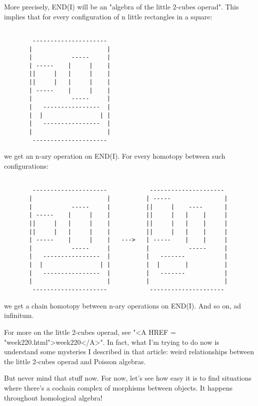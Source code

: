 More precisely, END(I) will be an "algebra of the little 2-cubes 
operad".  This implies that for every configuration of n little 
rectangles in a square:


\begin{verbatim}

        ---------------------
       |                     |
       |           -----     |
       | -----    |     |    | 
       ||     |   |     |    |
       ||     |   |     |    |           
       | -----    |     |    |            
       |           -----     |     
       |   ----------------  |
       |  |                | |
       |   ----------------  |
       |                     |
        ---------------------
\end{verbatim}
    

we get an n-ary operation on END(I).  For every homotopy between
such configurations:


\begin{verbatim}

        ---------------------            ---------------------
       |                     |          | -----               |
       |           -----     |          ||     |    ----      |
       | -----    |     |    |          ||     |   |    |     |
       ||     |   |     |    |          ||     |   |    |     |
       ||     |   |     |    |          ||     |   |    |     |        
       | -----    |     |    |   --->   | -----    |    |     |  
       |           -----     |          |           -----     |   
       |   ----------------  |          |   -------           |     
       |  |                | |          |  |       |          |
       |   ----------------  |          |   -------           |
       |                     |          |                     |
        ---------------------            ---------------------
\end{verbatim}
    
we get a chain homotopy between n-ary operations on END(I).  And
so on, ad infinitum.  

For more on the little 2-cubes operad, see "<A HREF = "week220.html">week220</A>".  In fact, 
what I'm trying to do now is understand some mysteries I described 
in that article: weird relationships between the little 2-cubes
operad and Poisson algebras.

But never mind that stuff now.  For now, let's see how easy it is to 
find situations where there's a cochain complex of morphisms between 
objects.  It happens throughout homological algebra!  

